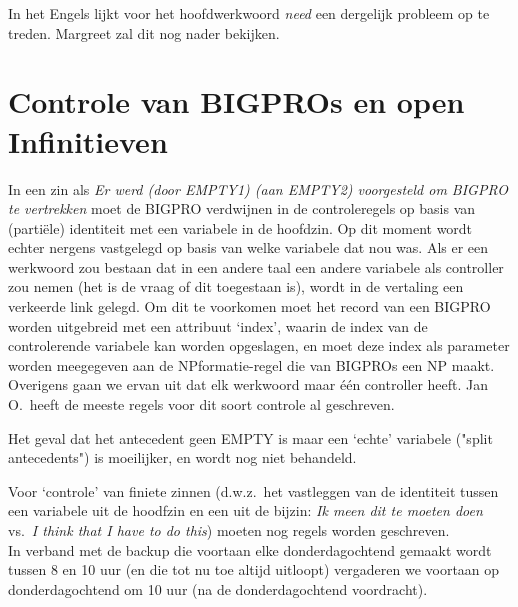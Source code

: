 In het Engels lijkt voor het hoofdwerkwoord {\em need\/} een dergelijk probleem 
op te treden. Margreet zal dit nog nader bekijken.

\section{Controle van BIGPROs en open Infinitieven}
In een zin als {\em Er werd (door EMPTY1) (aan EMPTY2) voorgesteld om BIGPRO 
te vertrekken\/} moet de BIGPRO verdwijnen in de controleregels op 
basis van (parti\"{e}le) identiteit met een variabele in de hoofdzin. Op dit 
moment wordt echter nergens vastgelegd op basis van welke variabele dat nou 
was. Als er een werkwoord zou bestaan dat in een andere taal een andere 
variabele als controller zou nemen (het is de vraag of dit toegestaan is), 
wordt in de vertaling een verkeerde link gelegd. Om dit te voorkomen moet het 
record van een BIGPRO worden uitgebreid met een attribuut `index', waarin de 
index van de controlerende variabele kan worden opgeslagen, en moet deze index 
als parameter worden meegegeven aan de NPformatie-regel die van BIGPROs een NP 
maakt. Overigens gaan we ervan uit dat elk werkwoord maar \'{e}\'{e}n 
controller heeft. Jan O.\ heeft de meeste regels voor dit soort controle al 
geschreven.

Het geval dat het antecedent geen EMPTY is maar een `echte' variabele ("split
antecedents") is moeilijker, en wordt nog niet behandeld.

Voor `controle' van finiete zinnen (d.w.z.\ het vastleggen van de identiteit 
tussen een variabele 
uit de hoodfzin en een uit de bijzin: {\em Ik meen dit te moeten doen\/} vs.\ 
{\em I think that {\em I} have to do this\/}) moeten nog regels worden 
geschreven.\\[4ex]


In verband met de backup die voortaan elke donderdagochtend gemaakt wordt 
tussen  8 en 10 uur (en die tot nu toe altijd uitloopt) vergaderen we voortaan 
op donderdagochtend om 10 uur (na de donderdagochtend voordracht).



